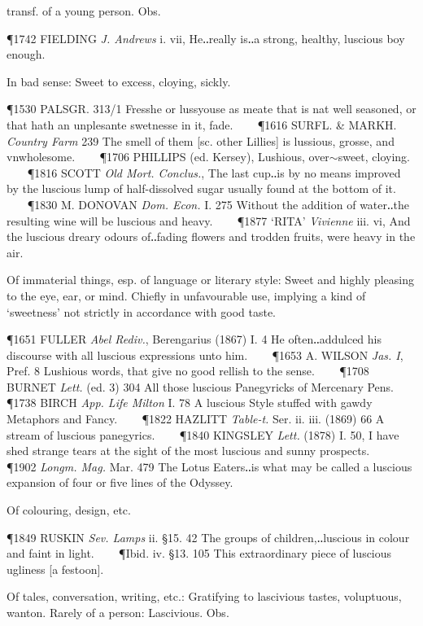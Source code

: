 \begin{description}[wide, labelwidth=!, labelindent=0pt]
\begin{myenumerate}
 transf. of a young person. Obs.

\P 1742 FIELDING  \textit{J. Andrews} i. vii, He‥really is‥a strong, healthy, luscious boy enough.

 In bad sense: Sweet to excess, cloying, sickly.

\P 1530 PALSGR. 313/1 Fresshe or lussyouse as meate that is nat well seasoned, or that hath an unplesante swetnesse in it, fade.    
\P 1616 SURFL. \& MARKH.  \textit{Country Farm} 239 The smell of them [sc. other Lillies] is lussious, grosse, and vnwholesome.    
\P 1706 PHILLIPS  (ed. Kersey), Lushious, over$\sim$sweet, cloying.    
\P 1816 SCOTT  \textit{Old Mort. Conclus.}, The last cup‥is by no means improved by the luscious lump of half-dissolved sugar usually found at the bottom of it.    
\P 1830 M. DONOVAN  \textit{Dom. Econ.} I. 275 Without the addition of water‥the resulting wine will be luscious and heavy.    
\P 1877 ‘RITA’  \textit{Vivienne} iii. vi, And the luscious dreary odours of‥fading flowers and trodden fruits, were heavy in the air.

 Of immaterial things, esp. of language or literary style: Sweet and highly pleasing to the eye, ear, or mind. Chiefly in unfavourable use, implying a kind of ‘sweetness’ not strictly in accordance with good taste.

\P 1651 FULLER  \textit{Abel Rediv.}, Berengarius (1867) I. 4 He often‥addulced his discourse with all luscious expressions unto him.    
\P 1653 A. WILSON  \textit{Jas. I}, Pref. 8 Lushious words, that give no good rellish to the sense.    
\P 1708 BURNET  \textit{Lett.} (ed. 3) 304 All those luscious Panegyricks of Mercenary Pens.    
\P 1738 BIRCH  \textit{App. Life Milton} I. 78 A luscious Style stuffed with gawdy Metaphors and Fancy.    
\P 1822 HAZLITT  \textit{Table-t.} Ser. ii. iii. (1869) 66 A stream of luscious panegyrics.    
\P 1840 KINGSLEY  \textit{Lett.} (1878) I. 50, I have shed strange tears at the sight of the most luscious and sunny prospects.    
\P 1902 \textit{Longm.  Mag.} Mar. 479 The Lotus Eaters‥is what may be called a luscious expansion of four or five lines of the Odyssey.

 Of colouring, design, etc.

\P 1849 RUSKIN  \textit{Sev. Lamps} ii. §15. 42 The groups of children,‥luscious in colour and faint in light.    
\P Ibid. iv. §13. 105 This extraordinary piece of luscious ugliness [a festoon].

 Of tales, conversation, writing, etc.: Gratifying to lascivious tastes, voluptuous, wanton. Rarely of a person: Lascivious. Obs.


\end{myenumerate}
\end{description}
